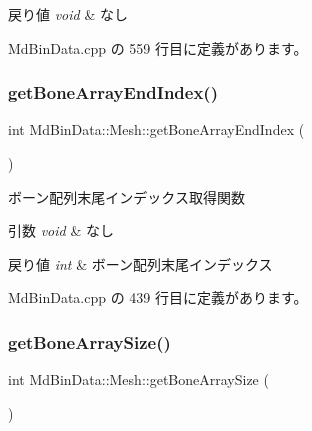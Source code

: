 \begin{DoxyRetVals}{戻り値}
{\em void} & なし \\
\hline
\end{DoxyRetVals}


 Md\+Bin\+Data.\+cpp の 559 行目に定義があります。

\mbox{\label{class_md_bin_data_1_1_mesh_a68304ec3065607d8e1a7ed775f53d95a}} 
\subsubsection{\texorpdfstring{get\+Bone\+Array\+End\+Index()}{getBoneArrayEndIndex()}}
{\footnotesize\ttfamily int Md\+Bin\+Data\+::\+Mesh\+::get\+Bone\+Array\+End\+Index (\begin{DoxyParamCaption}{ }\end{DoxyParamCaption})}



ボーン配列末尾インデックス取得関数 


\begin{DoxyParams}{引数}
{\em void} & なし \\
\hline
\end{DoxyParams}

\begin{DoxyRetVals}{戻り値}
{\em int} & ボーン配列末尾インデックス \\
\hline
\end{DoxyRetVals}


 Md\+Bin\+Data.\+cpp の 439 行目に定義があります。

\mbox{\label{class_md_bin_data_1_1_mesh_ae1dade2d63bbbdaf4125ec622f2ddbff}} 
\subsubsection{\texorpdfstring{get\+Bone\+Array\+Size()}{getBoneArraySize()}}
{\footnotesize\ttfamily int Md\+Bin\+Data\+::\+Mesh\+::get\+Bone\+Array\+Size (\begin{DoxyParamCaption}{ }\end{DoxyParamCaption})}



